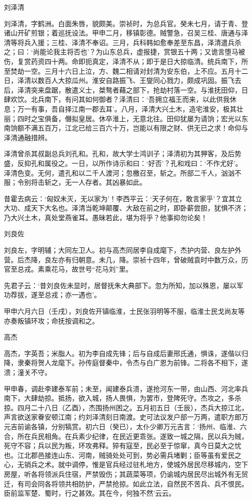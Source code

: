 \documentclass[]{article}
\begin{document}
刘泽清

刘泽清，字鹤洲。白面朱唇，貌颇美。崇祯时，为总兵官。癸未七月，请于青、登诸山开矿煎银；着巡抚设法。甲申二月，移镇彰德。贼警急，召吴三桂、唐通与泽清等将兵入援；三桂、泽清不奉诏。三月，兵科韩如愈奉差至东昌，泽清遣兵杀之；曰：`尚能论我主将否也'？为山东总兵，虚报捷，赏银五十两；又诡言堕马被伤，复赏药资四十两。命即扼真定，泽清不从；即于是日大掠临清。统兵南下，所至焚劫一空。三月十六日上泣，方、魏二相请对封清为安东伯，上不应。五月十二日，泽清以数百人大掠瓜州。淮安自路振飞、王燮同心戮力，颇成巩固。振飞去后，泽清突来盘踞，散遣义士，桀骜者藉之部下，抢劫村落一空。与淮抚田仰，日肆欢饮。北兵南下，有问其如何御者？泽清曰：`吾拥立福王而来，以此供我休息；万一有事，吾自择江南一郡去耳'。八月，泽清大兴土木，造宅淮安，极其壮丽；四时之宝俱备，僭拟皇居。休卒淮上，无意北往。田仰犹屡为请饷；宏光以东南饷额不满五百万，江北已给三百六十万，岂能以有限之财、供无已之求！命仰与泽清通融措辨。

泽清曾杀其叔副总兵刘孔和。孔和，故大学士鸿训子；泽清初为其狎客，及后势盛，反抑孔和属役之。一日，以所作诗示和曰：`好否'？孔和戏曰：`不作尤好'。泽清色变。无何，遣孔和以二千人渡河；忽檄召至，斩之。所部二千人，汹汹不服；令别将击斩之，无一人存者。其凶暴如此。

昔霍去病云：`匈奴未灭，无以家为'！李西平云：`天子何在，敢言家乎'？宜其立大功、成天下大名也。泽清当乾坤颠覆、大敌在前之时，即卧薪尝胆，犹惧不济；乃大兴土木，真处堂燕雀耳。愚昧若此，堪为将乎？他事抑勿论矣！

刘良佐

刘良左，字明辅；大同左卫人。初与高杰同居李自成麾下，杰护内营、良左护外营。后杰降，良左亦有归朝意。未几，降。崇祯十四年，曾破贼袁时中数万众，历官至总戎。素乘花马，故世号``花马刘''里。

先君子云：`昔刘良佐未显时，居督抚朱大典部下。忽为所知，加以殊恩，屡以军功荐拔，遂至总戎；亦一遇也'。

甲申六月六日（壬戌），刘良佐开镇临淮，士民张羽明等不服，临淮士民戈尚友等亦奏叛镇环攻；命抚按调和之。

高杰

高杰，字英吾；米脂人。初为李自成先锋；后与自成后妻邢氏通，惧诛，遂偕以归降，隶秦将贺人龙麾下。孙传庭督秦中，令杰与白广恩为前锋。二将各不相下，遂溃；潼关不守。

甲申春，调赴李建泰军前；未至，闻建泰兵溃，遂抢河东一带，由山西、河北率兵南下，大肆劫掠。抵扬，欲入城，扬人畏惧，为罢市，登陴死守。杰攻之，多杀掠。四月二十八日（乙酉），杰围扬州困之。五月初五日（壬辰），杰兵大掠江北，声言欲送家眷安顿江南；约刘泽清刻日南渡。史可法议发户部一万两，遣职方郎万元吉前谕各镇，分别犒赏。初六日（癸已），太仆少卿万元吉言：`扬州、临淮、六合，所在兵民相角。在兵素少纪律，在民近更乖张。遂致一城之隔，民以兵为贼，死守不容；兵以民为叛，环攻弗释。猝有寇至，民必至于惊窜，真今日莫大之忧也。江北郡邑接连山东、河南，贼骑处处可到，势必需兵堵剿；臣等虽有爱民之心，无销兵之术。就中调停，惟是官兵经过驻札地方，使城外居民尽移城内，空下房屋，听各将领派兵住宿，严禁毁伤；其蔬菜等项，仍谕城内居民尽出城外有无贸迁，有司会同各将领共相防护，严禁抢掠。如此立法，自然民不苦兵、兵不恨民。臣前监军楚、蜀时，行之甚效。其在今，何独不然'云云。
\end{document}
